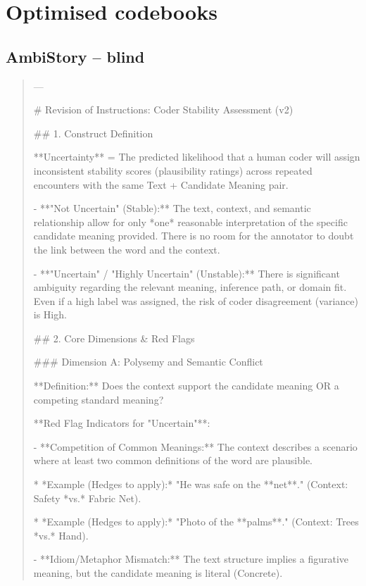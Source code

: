 \section{Optimised codebooks}
\label{app:codebooks}
\subsection*{AmbiStory -- blind}
\begin{quote}\small
---

# Revision of Instructions: Coder Stability Assessment (v2)



## 1. Construct Definition

**Uncertainty** = The predicted likelihood that a human coder will assign inconsistent stability scores (plausibility ratings) across repeated encounters with the same Text + Candidate Meaning pair.

- **"Not Uncertain" (Stable):** The text, context, and semantic relationship allow for only *one* reasonable interpretation of the specific candidate meaning provided. There is no room for the annotator to doubt the link between the word and the context.

- **"Uncertain" / "Highly Uncertain" (Unstable):** There is significant ambiguity regarding the relevant meaning, inference path, or domain fit. Even if a high label was assigned, the risk of coder disagreement (variance) is High.



## 2. Core Dimensions \& Red Flags



### Dimension A: Polysemy and Semantic Conflict

**Definition:** Does the context support the candidate meaning OR a competing standard meaning?

**Red Flag Indicators for "Uncertain"**:

- **Competition of Common Meanings:** The context describes a scenario where at least two common definitions of the word are plausible.

    *   *Example (Hedges to apply):* "He was safe on the **net**." (Context: Safety *vs.* Fabric Net).

    *   *Example (Hedges to apply):* "Photo of the **palms**." (Context: Trees *vs.* Hand).

- **Idiom/Metaphor Mismatch:** The text structure implies a figurative meaning, but the candidate meaning is literal (Concrete).


\end{quote}
